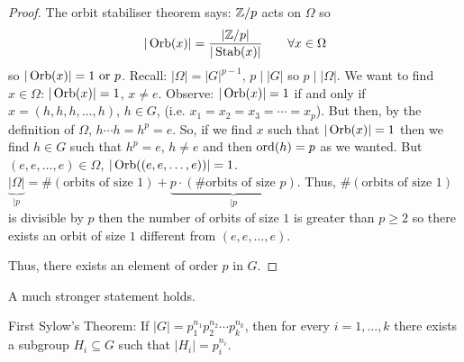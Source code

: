 \documentclass[10pt, a4paper]{article}
\begin{document}
\begin{theorem}[Cauchy]
\begin{proof}
        The orbit stabiliser theorem says:
        $\mathbb{Z} / p$ acts on $\Omega$ so
        \[
        |\operatorname{Orb}(x)| = \frac{|\mathbb{Z} / p|}{|\operatorname{Stab}(x)|}\qquad\forall x \in \Omega
        \]
        so $|\operatorname{Orb}(x)| = 1\text{ or } p$.
        Recall:
        $|\Omega| = |G| ^ {p - 1}$,
        $p \mid |G|$ so $p \mid |\Omega|$.
        We want to find $x \in \Omega$:
        $|\operatorname{Orb}(x)| = 1$,
        $x \neq e$.
        Observe:
        $|\operatorname{Orb}(x)| = 1$ if and only if $x = (h, h, h, \dotsc, h)$,
        $h \in G$,
        (i.e. $x_1 = x_2 = x_3 = \dotsi = x_p$).
        But then,
        by the definition of $\Omega$,
        $h \dotsi h = h ^ p = e$.
        So,
        if we find $x$ such that $|\operatorname{Orb}(x)| = 1$ then we find $h \in G$ such that $h ^ p = e$,
        $h \neq e$ and then $\operatorname{ord}(h) = p$ as we wanted.
        But $(e, e, \dotsc, e) \in \Omega$,
        $|\operatorname{Orb}((e, e, \dotsc, e))| = 1$.
        $\underbrace{|\Omega|}_{\mid p} = \#(\text{orbits of size $1$}) + \underbrace{p\cdot(\#\text{orbits of size $p$})}_{\mid p}$.
        Thus,
        $\#(\text{orbits of size $1$})$ is divisible by $p$ then the number of orbits of size $1$ is greater than $p \geq 2$ so there exists an orbit of size $1$ different from $(e, e, \dotsc, e)$.

        Thus,
        there exists an element of order $p$ in $G$.
    \end{proof}
\end{theorem}

\begin{remark}
    A much stronger statement holds.
    
    First Sylow's Theorem:
    If $|G| = p_1 ^ {n_1}p_2 ^ {n_2}\dotsi p_k ^ {n_k}$,
    then for every $i = 1, \dotsc, k$ there exists a subgroup $H_i \subseteq G$  such that $|H_i| = p_i ^ {n_i}$.
\end{remark}
\end{document}
